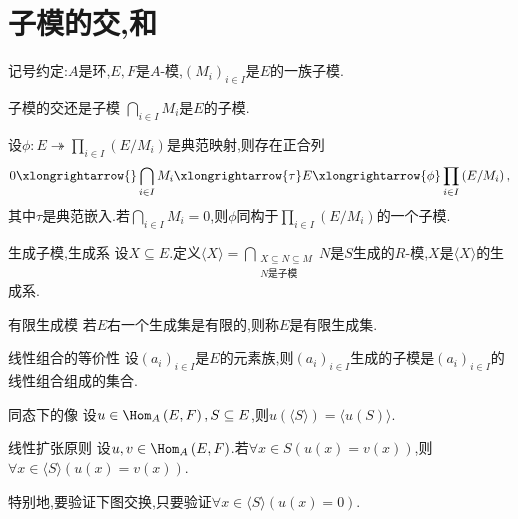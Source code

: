 \section{子模的交,和}

记号约定:$A$是环,$E,F$是$A$-模,$\left(M_{i}\right)_{i\in I}$是$E$的一族子模.

\begin{proposition}{子模的交还是子模}{}
	$\bigcap\limits_{i\in I}M_{i}$是$E$的子模.
\end{proposition}

\begin{proposition}{}{}
	设$\phi:E\twoheadrightarrow\prod\limits_{i\in I}\left(E/M_{i}\right)$是典范映射,则存在正合列
	\begin{align*}
		0\xlongrightarrow{}\bigcap\limits_{i\in I}M_{i}\xlongrightarrow{\tau}E\xlongrightarrow{\phi}\prod\limits_{i\in I}\left(E/M_{i}\right),
	\end{align*}
	其中$\tau$是典范嵌入.若$\bigcap\limits_{i\in I}M_{i}=0$,则$\phi$同构于$\prod\limits_{i\in I}\left(E/M_{i}\right)$的一个子模.
\end{proposition}

\begin{definition}{生成子模,生成系}{}
	设$X\subseteq E$.定义$\langle X\rangle=\bigcap\limits_{\substack{X\subseteq N\subseteq M\\N\text{是子模}}}N$是$S$生成的$R$-模,$X$是$\langle X\rangle$的生成系.
\end{definition}

\begin{definition}{有限生成模}{}
	若$E$右一个生成集是有限的,则称$E$是有限生成集.
\end{definition}

\begin{proposition}{线性组合的等价性}{}
	设$\left(a_{i}\right)_{i\in I}$是$E$的元素族,则$\left(a_{i}\right)_{i\in I}$生成的子模是$\left(a_{i}\right)_{i\in I}$的线性组合组成的集合.
\end{proposition}

\begin{corollary}{同态下的像}{}
	设$u\in\Hom_{A}\left(E,F\right),S\subseteq E$,则$u\left(\langle S\rangle\right)=\langle u\left(S\right)\rangle$.
\end{corollary}

\begin{remark}{线性扩张原则}{}
	设$u,v\in\Hom_{A}\left(E,F\right)$.若$\forall x\in S\left(u\left(x\right)=v\left(x\right)\right)$,则$\forall x\in\langle S\rangle\left(u\left(x\right)=v\left(x\right)\right)$.
	
	特别地,要验证下图交换,只要验证$\forall x\in\langle S\rangle\left(u\left(x\right)=0\right)$.
	\begin{center}
	\end{center}
\end{remark}

